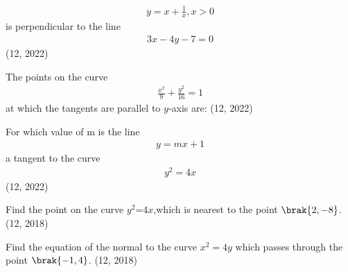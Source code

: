 \begin{align}
    y = x+\frac{1}{x}, x>0 
\end{align}
 is perpendicular to the line
 \begin{align}
     3x-4y-7 = 0 
 \end{align}
\hfill (12, 2022)
         \item The points on the curve
         \begin{align}
             \frac{x^2}{9} +\frac{y^2}{16} = 1
         \end{align}
         at which the tangents are parallel to $y$-axis are:
\hfill (12, 2022)
         \item For which value of m is the line
         \begin{align}
            y = mx + 1 
         \end{align}a tangent to the curve 
        \begin{align}
            y^2 = 4x 
        \end{align}
\hfill (12, 2022)
\item Find the point on the curve $y^2$=$4x$,which is nearest to the point $\brak{2,-8}$.  
\hfill (12, 2018)
\item Find the equation of the normal to the curve ${x}^2 = 4y$ which passes through the point $\brak{-1, 4}$.
\hfill (12, 2018)
